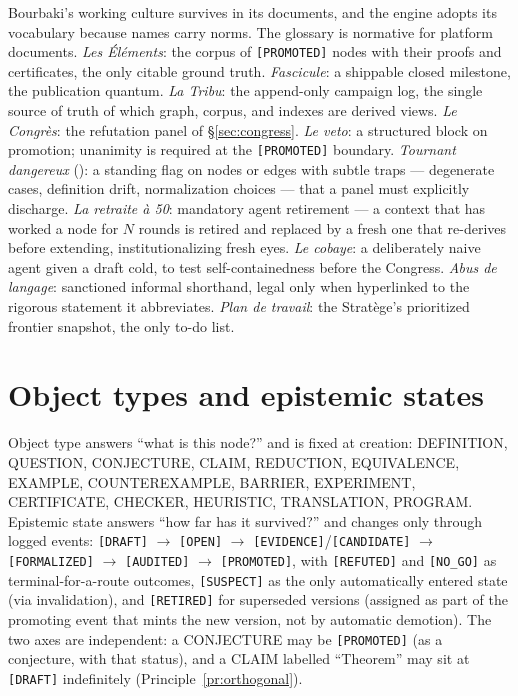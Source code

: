 \documentclass[11pt]{amsart}
\theoremstyle{definition}
\theoremstyle{remark}
\newcommand{\state}[1]{\texttt{[#1]}}
\newcommand{\otype}[1]{\textsc{#1}}
\begin{document}
Bourbaki's working culture survives in its documents, and the engine adopts its
vocabulary because names carry norms. The glossary is normative for platform
documents. \emph{Les \'El\'ements}: the corpus of \state{PROMOTED} nodes with
their proofs and certificates, the only citable ground truth. \emph{Fascicule}:
a shippable closed milestone, the publication quantum. \emph{La Tribu}: the
append-only campaign log, the single source of truth of which graph, corpus, and
indexes are derived views. \emph{Le Congr\`es}: the refutation panel of
\S\ref{sec:congress}. \emph{Le veto}: a structured block on promotion; unanimity
is required at the \state{PROMOTED} boundary. \emph{Tournant dangereux}
(\dbend): a standing flag on nodes or edges with subtle traps --- degenerate
cases, definition drift, normalization choices --- that a panel must explicitly
discharge. \emph{La retraite \`a 50}: mandatory agent retirement --- a context
that has worked a node for $N$ rounds is retired and replaced by a fresh one that
re-derives before extending, institutionalizing fresh eyes. \emph{Le cobaye}: a
deliberately naive agent given a draft cold, to test self-containedness before
the Congress. \emph{Abus de langage}: sanctioned informal shorthand, legal only
when hyperlinked to the rigorous statement it abbreviates. \emph{Plan de
travail}: the Strat\`ege's prioritized frontier snapshot, the only to-do list.

\section{Object types and epistemic states}\label{app:states}

Object type answers ``what is this node?'' and is fixed at creation:
\otype{DEFINITION}, \otype{QUESTION}, \otype{CONJECTURE}, \otype{CLAIM},
\otype{REDUCTION}, \otype{EQUIVALENCE}, \otype{EXAMPLE}, \otype{COUNTEREXAMPLE},
\otype{BARRIER}, \otype{EXPERIMENT}, \otype{CERTIFICATE}, \otype{CHECKER},
\otype{HEURISTIC}, \otype{TRANSLATION}, \otype{PROGRAM}. Epistemic state answers
``how far has it survived?'' and changes only through logged events:
\state{DRAFT} $\to$ \state{OPEN} $\to$ \state{EVIDENCE}/\state{CANDIDATE} $\to$
\state{FORMALIZED} $\to$ \state{AUDITED} $\to$ \state{PROMOTED}, with
\state{REFUTED} and \state{NO\_GO} as terminal-for-a-route outcomes,
\state{SUSPECT} as the only automatically entered state (via invalidation), and
\state{RETIRED} for superseded versions (assigned as part of the promoting event
that mints the new version, not by automatic demotion). The two axes are
independent: a
\otype{CONJECTURE} may be \state{PROMOTED} (as a conjecture, with that status),
and a \otype{CLAIM} labelled ``Theorem'' may sit at \state{DRAFT}
indefinitely (Principle~\ref{pr:orthogonal}).
\end{document}
